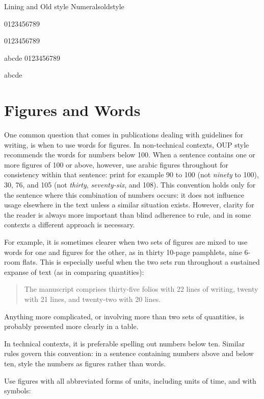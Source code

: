 \begin{texexample}{Lining and Old style Numerals}{oldstyle}
\bgroup
\def\temp{
\fontspec[Numbers=Lining]{TeX Gyre Bonum}
0123456789

\fontspec[Numbers=SlashedZero]{TeX Gyre Bonum}
0123456789

abcde 0123456789
}
\ifxetex 
\temp
\else
  abcde 
\fi
\egroup
\end{texexample}

\section{Figures and Words}

One common question that comes in publications dealing with guidelines for writing, is when to use words for figures. In non-technical contexts, OUP style recommends the words for numbers below
100. When a sentence contains one or more figures of 100 or above,
however, use arabic figures throughout for consistency within that
sentence: print for example 90 to 100 (not \textit{ninety} to 100), 30, 76, and 105
(not \textit{thirty}, \textit{seventy-six}, and 108). This convention holds only for the sentence
where this combination of numbers occurs: it does not influence
usage elsewhere in the text unless a similar situation exists.
However, clarity for the reader is always more important than blind adherence
to rule, and in some contexts a different approach is necessary. 

For example, it is sometimes clearer when two sets of figures are mixed to
use words for one and figures for the other, as in thirty 10-page pamphlets,
nine 6-room flats. This is especially useful when the two sets run throughout
a sustained expanse of text (as in comparing quantities):
\begin{quote}
The manuscript comprises thirty-five folios with 22 lines of writing, twenty
with 21 lines, and twenty-two with 20 lines.
\end{quote}

Anything more complicated, or involving more than two sets of quantities,
is probably presented more clearly in a table.

In technical contexts, it is preferable  spelling out numbers below
ten. Similar rules govern this convention: in a sentence containing
numbers above and below ten, style the numbers as figures rather
than words.

Use figures with all abbreviated forms of units, including units of time,
and with symbols:


